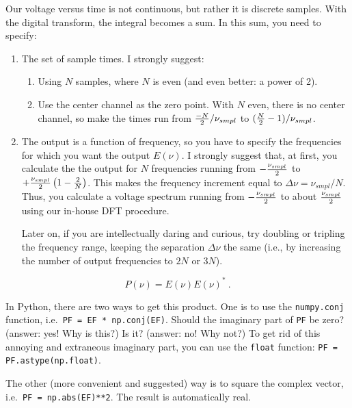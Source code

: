 \documentclass[11pt]{article}
\begin{document}
Our voltage versus time is not continuous, but rather it is discrete
samples. With the digital transform, the integral becomes a sum. In
this sum, you need to specify:
\begin{enumerate}
\item The set of sample times. I strongly suggest:
\begin{enumerate}
\item  Using $N$ samples, where $N$ is even (and even better: a power of 2).
\item Use the center
  channel as the zero point. With $N$ even, there is no center channel,
  so make the times run from ${-N \over 2}/
  \nu_{smpl}$ to $({N \over 2} -1)/ \nu_{smpl}$.
\end{enumerate}
\item The output is a function of frequency, so you have to specify the
  frequencies for which you want the output $E(\nu)$. I strongly
  suggest that, at first, you calculate the the output for $N$
  frequencies running from $-{\nu_{smpl} \over 2}$ to $+{\nu_{smpl}
  \over 2} \left( 1 - {2 \over N} \right)$. This makes the frequency
  increment equal to  $\Delta \nu = \nu_{smpl}/N$. Thus, you
  calculate a voltage spectrum running from $-{\nu_{smpl} \over
  2}$ to about ${\nu_{smpl} \over 2}$ using our in-house DFT procedure.

Later on, if you are intellectually daring and curious, try doubling or
tripling the frequency range, keeping the separation $\Delta \nu$ the
same (i.e., by increasing the number of output frequencies to $2N$ or $3N$).

\end{enumerate}

\begin{equation}
P(\nu) = E(\nu) E(\nu)^* \ .
\end{equation}
 
\noindent In Python, there are two ways to get this product.  One is to use
the \verb$numpy.conj$ function, i.e.\ {\tt PF = EF * np.conj(EF)}.  Should the
imaginary part of \verb$PF$ be zero? (answer: yes! Why is this?) Is it?
(answer: no! Why not?) To get rid of this annoying and extraneous
imaginary part, you can use the \verb$float$ function: 
\verb$PF = PF.astype(np.float)$. 
 
The other (more convenient and suggested) way is to square the 
complex vector, i.e.\ \verb$PF = np.abs(EF)**2$. The result is
automatically real.
\end{document}
